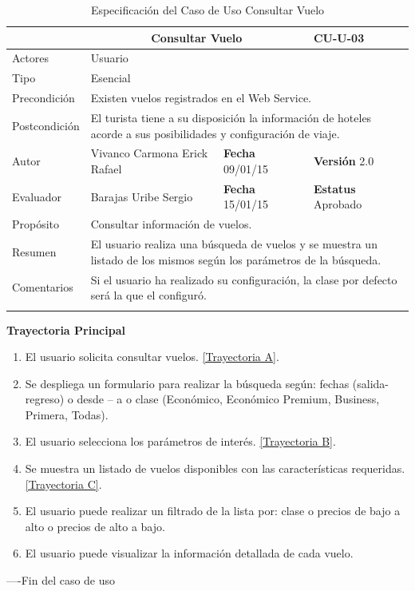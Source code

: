 \begin{longtable}{|p{2.5cm}|p{6.4cm}|p{2cm}|p{2cm}|}
	\hline
		\rowcolor[RGB]{255,102,102}{Caso de Uso}&\multicolumn{2}{c}{Consultar Vuelo}&{\textbf{CU-U-03}}\\
	\hline
		{Actores}&\multicolumn{3}{p{11.2cm}|}{Usuario}\\
	\hline
		{Tipo}&\multicolumn{3}{p{11.2cm}|}{Esencial}\\
	\hline
		{Precondición}&\multicolumn{3}{p{11.2cm}|}{Existen vuelos registrados en el Web Service.}\\
	\hline
		{Postcondición}&\multicolumn{3}{p{11.2cm}|}{El turista tiene a su disposición la información de hoteles acorde a sus posibilidades y configuración de viaje.}\\
	\hline
		{Autor}&{Vivanco Carmona Erick Rafael}&{\textbf{Fecha} 09/01/15}&{\textbf{Versión} 2.0}\\
			\hline
		{Evaluador}&{Barajas Uribe Sergio}&{\textbf{Fecha} 15/01/15}&{\textbf{Estatus} Aprobado}\\
	\hline
		{Propósito}&\multicolumn{3}{p{11.2cm}|}{Consultar información de vuelos.}\\
	\hline
		{Resumen}&\multicolumn{3}{p{11.2cm}|}{El usuario realiza una búsqueda de vuelos y se muestra un listado de los mismos según los parámetros de la búsqueda.}\\	
	\hline
		{Comentarios}&\multicolumn{3}{p{11.2cm}|}{Si el usuario ha realizado su configuración, la clase por defecto será la que el configuró.}\\	
	\hline
	\caption[Especificación del Caso de Uso Consultar Vuelo]{Especificación del Caso de Uso Consultar Vuelo}
    	\label{tab:cuConsultarVuelo}
\end{longtable}
\newpage
\begin{flushleft}
	\textbf{Trayectoria Principal}\\
	\begin{enumerate}
		\item El usuario solicita consultar vuelos. \hyperlink{TrayectoriaA_CU-U-03}{[Trayectoria A]}.
		\item Se despliega un formulario para realizar la búsqueda según: fechas (salida- regreso) o desde – a o clase (Económico, Económico Premium, Business, Primera, Todas).
		\item El usuario selecciona los parámetros de interés. \hyperlink{TrayectoriaB_CU-U-03}{[Trayectoria B]}.
		\item Se  muestra un listado de vuelos disponibles con las características requeridas. \hyperlink{TrayectoriaC_CU-U-03}{[Trayectoria C]}.
		\item El usuario puede realizar un filtrado de la lista por: clase o precios de bajo a alto o precios de alto a bajo.
		\item	El usuario puede visualizar la información detallada de cada vuelo.
	\end{enumerate}
\end{flushleft}
----Fin del caso de uso

